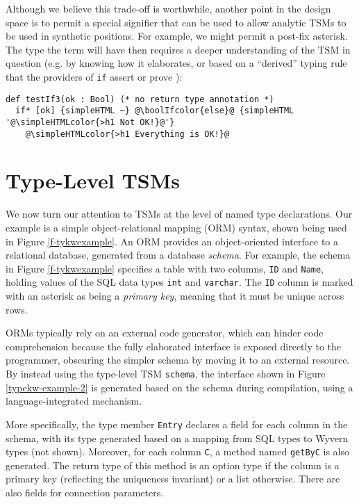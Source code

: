 \documentclass{sig-alternate}[10pt]
\newcommand{\simpleHTMLcolor}[1]{\textcolor[HTML]{7D5100}{#1}}
\newcommand{\boolIfcolor}[1]{\textcolor[HTML]{5E0C0C}{#1}}
\begin{document}
Although we believe this trade-off is worthwhile, another point in the design space is to permit a special signifier that can be used to allow analytic TSMs to be used in synthetic positions. For example, we might permit a post-fix asterisk. The type the term will have then requires a deeper understanding of the TSM in question (e.g. by knowing how it elaborates, or based on a ``derived'' typing rule that the providers of \verb|if| assert or prove \cite{conf/icfp/LorenzenE13}):

\begin{lstlisting}[style=wyvern]
def testIf3(ok : Bool) (* no return type annotation *)
  if* [ok] {simpleHTML ~} @\boolIfcolor{else}@ {simpleHTML '@\simpleHTMLcolor{>h1 Not OK!}@'}
    @\simpleHTMLcolor{>h1 Everything is OK!}@
\end{lstlisting}

\section{Type-Level TSM\lowercase{s}}\label{tsms-type}
We now turn our attention to TSMs at the level of named type declarations. Our example is a simple object-relational mapping (ORM) syntax, shown being used in Figure \ref{f-tykwexample}. An ORM provides an object-oriented interface to a relational database, generated from a database \emph{schema}. For example, the schema in Figure \ref{f-tykwexample} specifies a table with two columns, \verb|ID| and \verb|Name|, holding values of the SQL data types \verb|int| and \verb|varchar|. The \verb|ID| column is marked with an asterisk as being a \emph{primary key}, meaning that it must be unique across rows. 

ORMs typically rely on an external code generator, which can hinder code comprehension because the fully elaborated interface is exposed directly to the programmer, obscuring the simpler schema by moving it to an external resource. By instead using the type-level TSM \verb|schema|, the interface shown in Figure \ref{typekw-example-2} is generated based on the schema during compilation, using a language-integrated mechanism. 

More specifically, the type member \verb|Entry| declares a field for each column in the schema, with its type generated based on a mapping from SQL types to Wyvern types (not shown). Moreover, for each column \verb|C|, a method named \verb|getByC| is also generated. The return type of this method is an option type if the column is a primary key (reflecting the uniqueness invariant) or a list otherwise. There are also fields for connection parameters. 
\end{document}
